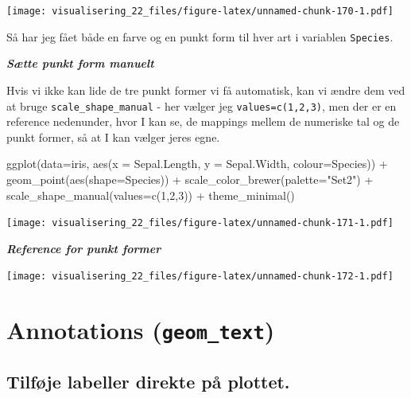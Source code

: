 \documentclass[
]{book}
\newenvironment{Shaded}{\begin{snugshade}}{\end{snugshade}}
\newcommand{\AttributeTok}[1]{\textcolor[rgb]{0.77,0.63,0.00}{#1}}
\newcommand{\DecValTok}[1]{\textcolor[rgb]{0.00,0.00,0.81}{#1}}
\newcommand{\FunctionTok}[1]{\textcolor[rgb]{0.00,0.00,0.00}{#1}}
\newcommand{\NormalTok}[1]{#1}
\newcommand{\SpecialCharTok}[1]{\textcolor[rgb]{0.00,0.00,0.00}{#1}}
\newcommand{\StringTok}[1]{\textcolor[rgb]{0.31,0.60,0.02}{#1}}
\begin{document}
\texttt{[image: visualisering\_22\_files/figure-latex/unnamed-chunk-170-1.pdf]}

Så har jeg fået både en farve og en punkt form til hver art i variablen \texttt{Species}.

\textbf{\emph{Sætte punkt form manuelt}}

Hvis vi ikke kan lide de tre punkt former vi få automatisk, kan vi ændre dem ved at bruge \texttt{scale\_shape\_manual} - her vælger jeg \texttt{values=c(1,2,3)}, men der er en reference nedenunder, hvor I kan se, de mappings mellem de numeriske tal og de punkt former, så at I kan vælger jeres egne.

\begin{Shaded}
\begin{Highlighting}[]
\FunctionTok{ggplot}\NormalTok{(}\AttributeTok{data=}\NormalTok{iris, }\FunctionTok{aes}\NormalTok{(}\AttributeTok{x =}\NormalTok{ Sepal.Length, }\AttributeTok{y =}\NormalTok{ Sepal.Width, }\AttributeTok{colour=}\NormalTok{Species)) }\SpecialCharTok{+}
  \FunctionTok{geom\_point}\NormalTok{(}\FunctionTok{aes}\NormalTok{(}\AttributeTok{shape=}\NormalTok{Species)) }\SpecialCharTok{+} 
  \FunctionTok{scale\_color\_brewer}\NormalTok{(}\AttributeTok{palette=}\StringTok{"Set2"}\NormalTok{) }\SpecialCharTok{+}
  \FunctionTok{scale\_shape\_manual}\NormalTok{(}\AttributeTok{values=}\FunctionTok{c}\NormalTok{(}\DecValTok{1}\NormalTok{,}\DecValTok{2}\NormalTok{,}\DecValTok{3}\NormalTok{)) }\SpecialCharTok{+}
  \FunctionTok{theme\_minimal}\NormalTok{()}
\end{Highlighting}
\end{Shaded}

\texttt{[image: visualisering\_22\_files/figure-latex/unnamed-chunk-171-1.pdf]}

\textbf{\emph{Reference for punkt former}}

\texttt{[image: visualisering\_22\_files/figure-latex/unnamed-chunk-172-1.pdf]}

\hypertarget{annotations-geom_text}{%
\section{\texorpdfstring{Annotations (\texttt{geom\_text})}{Annotations (geom\_text)}}\label{annotations-geom_text}}

\hypertarget{tilfuxf8je-labeller-direkte-puxe5-plottet.}{%
\subsection{Tilføje labeller direkte på plottet.}\label{tilfuxf8je-labeller-direkte-puxe5-plottet.}}
\end{document}
